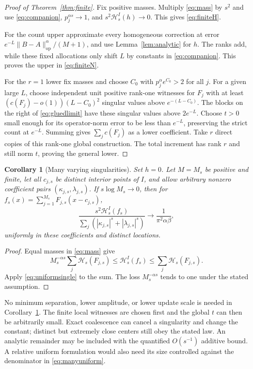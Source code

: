 \documentclass[11pt]{article}
\newtheorem{corollary}[theorem]{Corollary}
\numberwithin{equation}{section}
\newcommand{\op}{\mathrm{op}}
\newcommand{\cH}{\mathcal H}
\begin{document}
\begin{proof}[Proof of Theorem~\ref{thm:finite}]
Fix positive masses. Multiply \eqref{eq:mass} by $s^2$ and use
\eqref{eq:companion}, $p_j^{\alpha s}\to1$, and
$s^2\cH_s^I(h)\to0$. This gives \eqref{eq:finiteH}.

For the count upper approximate every homogeneous correction at error
$e^{-L}\|B-A\|_{\op}^{\alpha}/(M+1)$, and use
Lemma~\ref{lem:analytic} for $h$.
The ranks add, while these fixed allocations only shift $L$ by constants
in \eqref{eq:companion}. This proves the upper in \eqref{eq:finiteN}.

For the $r=1$ lower fix masses and choose $C_0$ with
$p_j^\alpha e^{C_0}>2$ for all $j$.
For a given large $L$, choose independent unit positive rank-one
witnesses for $F_j$ with at least
$(c(F_j)-o(1))(L-C_0)^2$ singular values above $e^{-(L-C_0)}$.
The blocks on the right of \eqref{eq:gluedlimit} have these singular
values above $2e^{-L}$. Choose $t>0$ small enough for its operator-norm
error to be less than $e^{-L}$, preserving the strict count at $e^{-L}$.
Summing gives $\sum_jc(F_j)$ as a lower coefficient.
Take $r$ direct copies of this rank-one global construction. The total
increment has rank $r$ and still norm $t$, proving the general lower.
\end{proof}

\begin{corollary}[Many varying singularities]\label{cor:uniform}
Set $h=0$. Let $M=M_s$ be positive and finite, let all
$c_{j,s}$ be distinct interior points of $I$, and allow arbitrary
nonzero coefficient pairs $(\kappa_{j,s},\lambda_{j,s})$.
If $s\log M_s\to0$, then for
$f_s(x)=\sum_{j=1}^{M_s}F_{j,s}(x-c_{j,s})$,
\begin{equation}\label{eq:manyuniform}
 \frac{s^2\cH_s^I(f_s)}
 {\sum_j(|\kappa_{j,s}|^s+|\lambda_{j,s}|^s)}
             \longrightarrow\frac1{\pi^2\alpha\beta},
\end{equation}
uniformly in these coefficients and distinct locations.
\end{corollary}
\begin{proof}
Equal masses in \eqref{eq:mass} give
\[
 M_s^{-\alpha s}\sum_j\cH_s(F_{j,s})
 \le\cH_s^I(f_s)\le\sum_j\cH_s(F_{j,s}).
\]
Apply \eqref{eq:uniformsingle} to the sum. The loss
$M_s^{-\alpha s}$ tends to one under the stated assumption.
\end{proof}

No minimum separation, lower amplitude, or lower update scale is needed
in Corollary~\ref{cor:uniform}. The finite local witnesses are chosen
first and the global $t$ can then be arbitrarily small.
Exact coalescence can cancel a singularity and change the constant;
distinct but extremely close centers still obey the stated law.
An analytic remainder may be included with the quantified
$O(s^{-1})$ additive bound. A relative uniform formulation would also
need its size controlled against the denominator in
\eqref{eq:manyuniform}.
\end{document}
